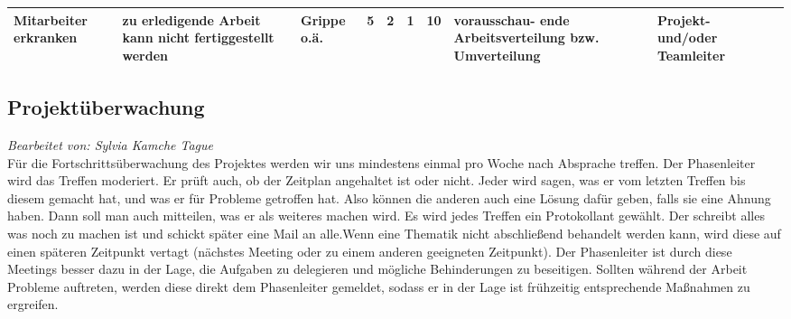 \begin{center}
{\begin{tabular}{|p{1.5cm}|p{1.5cm}|p{1.7cm}|p{1.5cm}|p{0.25cm}|p{0.25cm}|p{0.25cm}|p{0.5cm}|p{1.5cm}|p{1.5cm}|}
{
	Mitarbeiter erkranken
}&

{
	zu erledigende Arbeit kann nicht fertiggestellt werden
}&

{
	Grippe o.\"{a}.
}&

{
	5
}&

{
	2
}&

{
	1
}&

{
	10
}&

{
	vorausschau- \newline ende Arbeitsverteilung bzw. Umverteilung
}&

{
	Projekt- und/oder Teamleiter
}	\\ \hline
%
%

\end{tabular}}
	\end{center}
	
\subsection{Projektüberwachung}\label{3.4-controlling}
\textit{Bearbeitet von: Sylvia Kamche Tague }\\
Für die Fortschrittsüberwachung des Projektes werden wir uns mindestens einmal pro Woche nach Absprache treffen. 
Der Phasenleiter wird das Treffen moderiert. Er prüft auch, ob der Zeitplan angehaltet ist oder nicht. 
Jeder wird sagen, was er vom letzten Treffen bis diesem gemacht hat, und was er für Probleme getroffen hat.
Also können die anderen auch eine Lösung dafür geben, falls sie eine Ahnung haben. Dann soll man auch mitteilen,
was er als weiteres machen wird. Es wird jedes Treffen ein Protokollant gewählt. Der schreibt alles was noch zu machen ist 
und schickt später eine Mail an alle.Wenn eine Thematik nicht abschließend behandelt werden kann,
wird diese auf einen späteren Zeitpunkt vertagt (nächstes Meeting oder zu einem anderen geeigneten Zeitpunkt). Der Phasenleiter ist durch
diese Meetings besser dazu in der Lage, die Aufgaben zu delegieren und mögliche Behinderungen zu beseitigen. 
Sollten während der Arbeit Probleme auftreten, werden diese direkt dem Phasenleiter gemeldet, 
sodass er in der Lage ist frühzeitig entsprechende Maßnahmen zu ergreifen.


